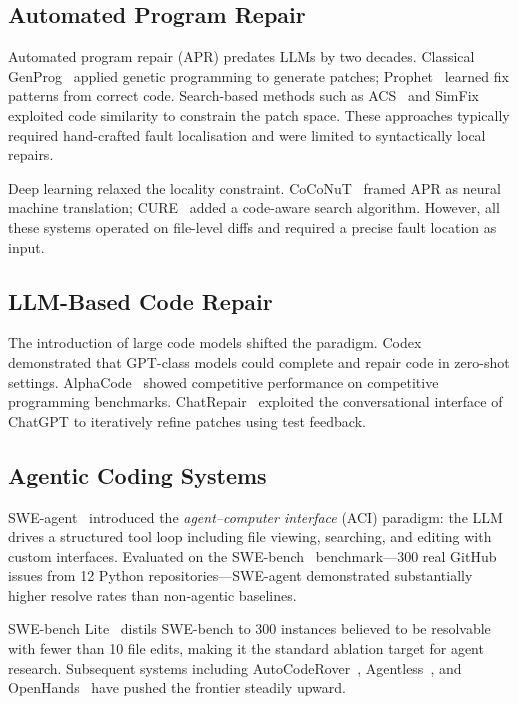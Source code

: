 \documentclass[11pt]{article}
\begin{document}
\subsection{Automated Program Repair}

Automated program repair (APR) predates LLMs by two decades.  Classical
GenProg~\citep{le2012genprog} applied genetic programming to generate patches;
Prophet~\citep{long2016prophet} learned fix patterns from correct code.
Search-based methods such as ACS~\citep{xiong2017acs} and
SimFix~\citep{jiang2018simfix} exploited code similarity to constrain the
patch space.  These approaches typically required hand-crafted fault
localisation and were limited to syntactically local repairs.

Deep learning relaxed the locality constraint.  CoCoNuT~\citep{lutellier2020coconut}
framed APR as neural machine translation; CURE~\citep{jiang2021cure} added
a code-aware search algorithm.  However, all these systems operated on
file-level diffs and required a precise fault location as input.

\subsection{LLM-Based Code Repair}

The introduction of large code models shifted the paradigm.  Codex~\citep{chen2021codex}
demonstrated that GPT-class models could complete and repair code in
zero-shot settings.  AlphaCode~\citep{li2022alphacode} showed competitive
performance on competitive programming benchmarks.  ChatRepair~\citep{xia2023chatrepair}
exploited the conversational interface of ChatGPT to iteratively refine
patches using test feedback.

\subsection{Agentic Coding Systems}

SWE-agent~\citep{yang2024sweagent} introduced the \emph{agent--computer
interface} (ACI) paradigm: the LLM drives a structured tool loop including
file viewing, searching, and editing with custom interfaces.  Evaluated on
the SWE-bench~\citep{jimenez2024swebench} benchmark---300 real GitHub issues
from 12 Python repositories---SWE-agent demonstrated substantially higher
resolve rates than non-agentic baselines.

SWE-bench Lite~\citep{jimenez2024swebench} distils SWE-bench to 300 instances
believed to be resolvable with fewer than 10 file edits, making it the
standard ablation target for agent research.  Subsequent systems including
AutoCodeRover~\citep{zhang2024autocoderover}, Agentless~\citep{xia2024agentless},
and OpenHands~\citep{wang2024openhands} have pushed the frontier steadily
upward.
\end{document}
